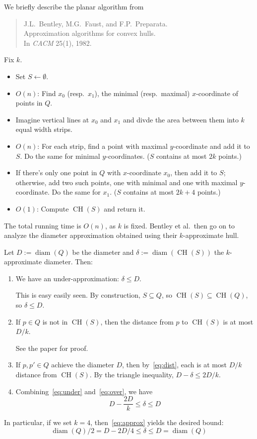 \documentclass[a4paper]{article}
\DeclareMathOperator{\diam}{diam}
\DeclareMathOperator{\CH}{CH}
\begin{document}
We briefly describe the planar algorithm from
\begin{quote}
	J.L.~Bentley, M.G.~Faust, and F.P.~Preparata.\\
	Approximation algorithms for convex hulls.\\
	In \emph{CACM} 25(1), 1982.
\end{quote}
Fix $k$.
\begin{itemize}
	\item Set $S \gets \emptyset$.
	
	\item $O(n)$:
	Find $x_0$ (resp.\ $x_1$), the minimal (resp.\ maximal) $x$-coordinate of points in $Q$.
	
	\item
	Imagine vertical lines at $x_0$ and $x_1$ and divde the area between them into $k$ equal width strips.
	
	\item $O(n)$: For each strip, find a point with maximal $y$-coordinate and add it to $S$.
	Do the same for minimal $y$-coordinates.
	($S$ contains at most $2k$ points.)
	
	\item 
	If there's only one point in $Q$ with $x$-coordinate $x_0$, then add it to $S$; otherwise, add two such points, one with minimal and one with maximal $y$-coordinate.
	Do the same for $x_1$.
	($S$ contains at most $2k+4$ points.)
	
	\item $O(1)$: Compute $\CH(S)$ and return it.
\end{itemize}
The total running time is $O(n)$, as $k$ is fixed.
Bentley et al.\ then go on to analyze the diameter approximation obtained using their $k$-approximate hull.

Let $D := \diam(Q)$ be the diameter and $\delta := \diam(\CH(S))$ the $k$-approximate diameter.
Then:
\begin{enumerate}
	\item\label{eq:under} We have an under-approximation: $\delta \le D$.
	
	This is easy easily seen.
	By construction, $S \subseteq Q$, so $\CH(S) \subseteq \CH(Q)$, so $\delta \le D$.

	\item\label{eq:dist} If $p \in Q$ is not in $\CH(S)$, then the distance from $p$ to $\CH(S)$ is at most $D/k$.
	
	See the paper for proof.
	
	\item\label{eq:over}
	If $p, p' \in Q$ achieve the diameter $D$, then by~\eqref{eq:dist}, each is at most $D/k$ distance from $\CH(S)$.
	By the triangle inequality, $D - \delta \le 2D/k$.
	
	\item\label{eq:approx}
	Combining~\eqref{eq:under} and~\eqref{eq:over}, we have
	\[
		D - \frac{2D}{k} \le \delta \le D
	\]
\end{enumerate}
In particular, if we set $k=4$, then~\eqref{eq:approx} yields the desired bound:
\[
	\diam(Q)/2 = D - 2D/4 \le \delta \le D = \diam(Q)
\]
\end{document}
